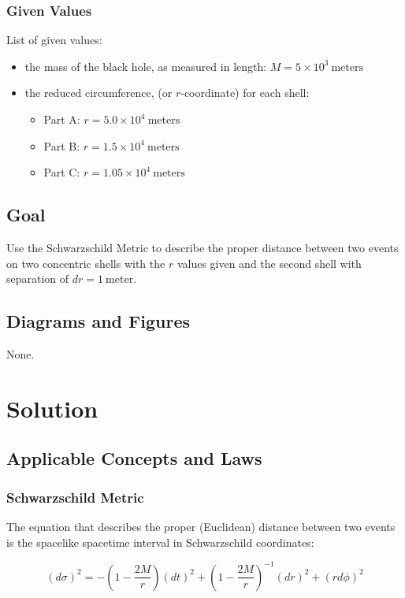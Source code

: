 \documentclass[]{report}
\begin{document}
        \subsubsection{Given Values}
          List of given values:
          \begin{itemize}
            \item the mass of the black hole, as measured in length: $M = 5\times10^3\ \text{meters}$
            \item the reduced circumference, (or $r$-coordinate) for each shell:
              \begin{itemize}
                \item Part A: $r=5.0\times10^4\ \text{meters}$
                \item Part B: $r=1.5\times10^4\ \text{meters}$
                \item Part C: $r=1.05\times10^4\ \text{meters}$
                \end{itemize}
            \end{itemize}

      \subsection{Goal}
        Use the Schwarzschild Metric to describe the proper distance between two events on two concentric shells with the $r$ values given and the second shell with separation of $dr = 1\ \text{meter}$.

      \subsection{Diagrams and Figures}
        None.

    \section{Solution}
      \subsection{Applicable Concepts and Laws}
        \subsubsection{Schwarzschild Metric}
          The equation that describes the proper (Euclidean) distance between two events is the spacelike spacetime interval in Schwarzschild coordinates:

          $$
          (d\sigma)^2=-\left(1-\frac{2M}{r}\right)(dt)^2+\left(1-\frac{2M}{r}\right)^{-1}(dr)^2+(rd\phi)^2
          $$
\end{document}
